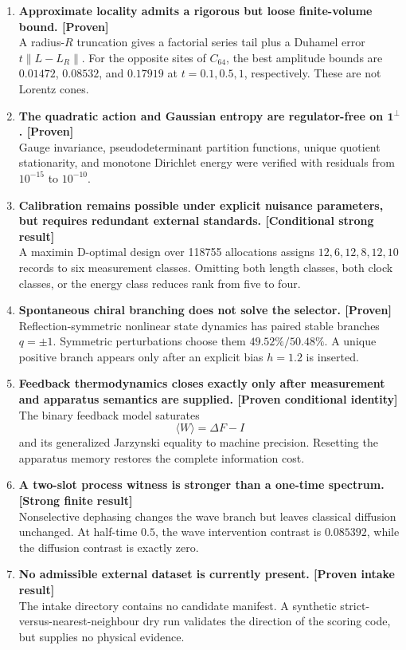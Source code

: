 \documentclass[11pt,a4paper,openany]{report}
\newcommand{\statusProven}{\textcolor{fingreen}{[Proven]}}
\begin{document}
\begin{enumerate}
\item 
\textbf{Approximate locality admits a rigorous but loose finite-volume bound. \statusProven{}}\\
A radius-\(R\) truncation gives a factorial series tail plus a Duhamel error \(t\|L-L_R\|\). For the opposite sites of \(C_{64}\), the best amplitude bounds are \(0.01472\), \(0.08532\), and \(0.17919\) at \(t=0.1,0.5,1\), respectively. These are not Lorentz cones.

\item 
\textbf{The quadratic action and Gaussian entropy are regulator-free on \(\mathbf1^\perp\). \statusProven{}}\\
Gauge invariance, pseudodeterminant partition functions, unique quotient stationarity, and monotone Dirichlet energy were verified with residuals from \(10^{-15}\) to \(10^{-10}\).

\item 
\textbf{Calibration remains possible under explicit nuisance parameters, but requires redundant external standards. [Conditional strong result]}\\
A maximin D-optimal design over 118755 allocations assigns \(12,6,12,8,12,10\) records to six measurement classes. Omitting both length classes, both clock classes, or the energy class reduces rank from five to four.

\item 
\textbf{Spontaneous chiral branching does not solve the selector. \statusProven{}}\\
Reflection-symmetric nonlinear state dynamics has paired stable branches \(q=\pm1\). Symmetric perturbations choose them \(49.52\%/50.48\%\). A unique positive branch appears only after an explicit bias \(h=1.2\) is inserted.

\item 
\textbf{Feedback thermodynamics closes exactly only after measurement and apparatus semantics are supplied. [Proven conditional identity]}\\
The binary feedback model saturates \[
    \langle W\rangle=\Delta F-I
    \] and its generalized Jarzynski equality to machine precision. Resetting the apparatus memory restores the complete information cost.

\item 
\textbf{A two-slot process witness is stronger than a one-time spectrum. [Strong finite result]}\\
Nonselective dephasing changes the wave branch but leaves classical diffusion unchanged. At half-time \(0.5\), the wave intervention contrast is \(0.085392\), while the diffusion contrast is exactly zero.

\item 
\textbf{No admissible external dataset is currently present. [Proven intake result]}\\
The intake directory contains no candidate manifest. A synthetic strict-versus-nearest-neighbour dry run validates the direction of the scoring code, but supplies no physical evidence.

\end{enumerate}
\end{document}
